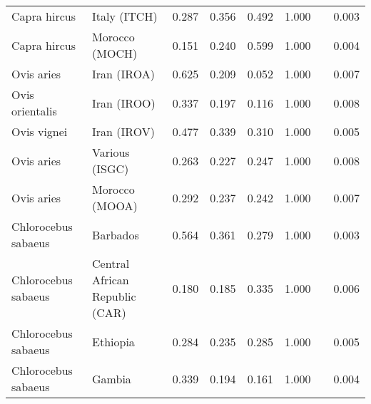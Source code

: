 \begin{center}
\begin{adjustbox}{width = 1\textwidth}
\begin{tabular}{|l|l|r|r|r|r|r|}
        Capra hircus &                    Italy (ITCH) &                 0.287 &                                0.356 &                0.492 &                                  1.000~~ &              0.003 \\
        Capra hircus &                  Morocco (MOCH) &                 0.151 &                                0.240 &                0.599 &                                  1.000~~ &              0.004 \\
          Ovis aries &                     Iran (IROA) &                 0.625 &                                0.209 &                0.052 &                                  1.000~~ &              0.007 \\
     Ovis orientalis &                     Iran (IROO) &                 0.337 &                                0.197 &                0.116 &                                  1.000~~ &              0.008 \\
         Ovis vignei &                     Iran (IROV) &                 0.477 &                                0.339 &                0.310 &                                  1.000~~ &              0.005 \\
          Ovis aries &                  Various (ISGC) &                 0.263 &                                0.227 &                0.247 &                                  1.000~~ &              0.008 \\
          Ovis aries &                  Morocco (MOOA) &                 0.292 &                                0.237 &                0.242 &                                  1.000~~ &              0.007 \\
 Chlorocebus sabaeus &                        Barbados &                 0.564 &                                0.361 &                0.279 &                                  1.000~~ &              0.003 \\
 Chlorocebus sabaeus &  Central African Republic (CAR) &                 0.180 &                                0.185 &                0.335 &                                  1.000~~ &              0.006 \\
 Chlorocebus sabaeus &                        Ethiopia &                 0.284 &                                0.235 &                0.285 &                                  1.000~~ &              0.005 \\
 Chlorocebus sabaeus &                          Gambia &                 0.339 &                                0.194 &                0.161 &                                  1.000~~ &              0.004 \\

\end{tabular}
\end{adjustbox}
\end{center}
